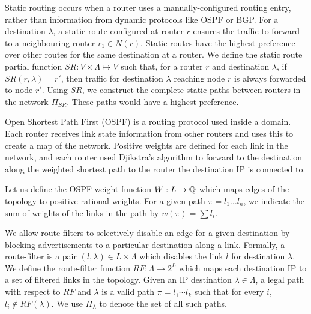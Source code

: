 Static routing occurs when a router uses a 
manually-configured routing entry, 
rather than information from dynamic protocols like
OSPF or BGP.  
For a destination $\lambda$, a static route configured
at router $r$ ensures the traffic to forward to a 
neighbouring router $r_1 \in N(r)$. 
Static routes have the highest
preference over other routes for the same destination
at a router. We define the static route
partial function $SR: V \times \Lambda \mapsto V$  such
that, for a router $r$ and destination $\lambda$, if $SR(r,\lambda)=r'$, 
then traffic for destination $\lambda$ reaching node $r$ is always
forwarded to node $r'$. 
Using $SR$, we construct the complete
static paths between routers in the network $\Pi_{SR}$. These 
paths would have a highest preference. 

Open Shortest Path First (OSPF) is a routing protocol used inside a
domain. Each router receives link state information from other routers
and uses this to create a map of the network. Positive weights
are defined for each link in the network, and 
each router used Djikstra's algorithm to
forward to the destination along the weighted shortest path 
to the router the destination IP is connected to. 

Let us
define the OSPF weight function $W: L \rightarrow \mathbb{Q}$ which 
maps edges of the topology to positive rational weights. 
For a given
path $\pi=l_1\ldots l_n$, we indicate the sum of weights of the
links in the path by $w(\pi)=\sum l_i$. 


We allow route-filters
to selectively disable an
edge for a given destination by  
blocking advertisements to a
particular destination along a link. 
Formally, a route-filter is a pair $(l,\lambda)\in L\times \Lambda$
which disables the link $l$ for destination $\lambda$. 
We define the route-filter function 
$RF: \Lambda \rightarrow 2^L$ which maps each destination IP
to a set of filtered links in the topology. 
Given an IP destination $\lambda\in \Lambda$, 
a legal path with respect to $RF$ and $\lambda$
is a valid path $\pi=l_1\cdots l_k$ such that for every $i$,
$l_i\not\in RF(\lambda)$.
We use $\Pi_\lambda$ to denote the set of all such paths.

